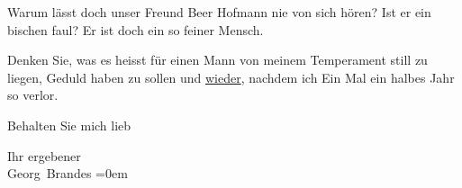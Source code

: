 \pstart
           Warum lässt doch unser Freund Beer Hofmann nie
               von sich hören? Ist er ein bischen faul? Er ist doch ein so feiner Mensch.\pend
           
\pstart
           Denken Sie, was es heisst für einen Mann von meinem Temperament still zu liegen,
               Geduld haben zu sollen und \uline{wieder}, nachdem ich Ein
               Mal ein halbes Jahr so verlor.\pend
           
\pstart
           Behalten Sie mich lieb\pend
           
\pstart
           Ihr ergebener{\\[\baselineskip]}\spacefill\mbox{Georg Brandes}\pend
           \leftskip=0em{}\endnumbering{}  \newcommand{\dateiname}{L00876}\newcommand{\titel}{Georg Brandes an Arthur Schnitzler, 7. 1. 1899}\newcommand{\editorInnen}{Martin Anton Müller und Gerd-Hermann Susen}

